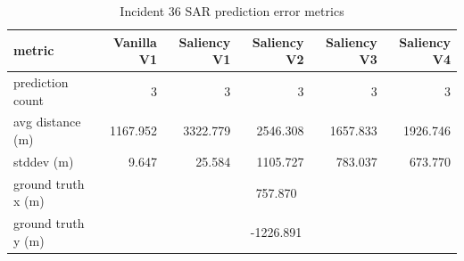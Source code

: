 \begin{table}[ht]
\centering
\caption{Incident 36 SAR prediction error metrics}
\label{tab:sar-incident-36}
\begin{tabular}{lrrrrr}
\hline
metric & Vanilla V1 & Saliency V1 & Saliency V2 & Saliency V3 & Saliency V4 \\
\hline
prediction count & 3 & 3 & 3 & 3 & 3 \\
avg distance (m) & 1167.952 & 3322.779 & 2546.308 & 1657.833 & 1926.746 \\
stddev (m) & 9.647 & 25.584 & 1105.727 & 783.037 & 673.770 \\
ground truth x (m) & \multicolumn{5}{c}{757.870} \\
ground truth y (m) & \multicolumn{5}{c}{-1226.891} \\
\hline
\end{tabular}
\end{table}
